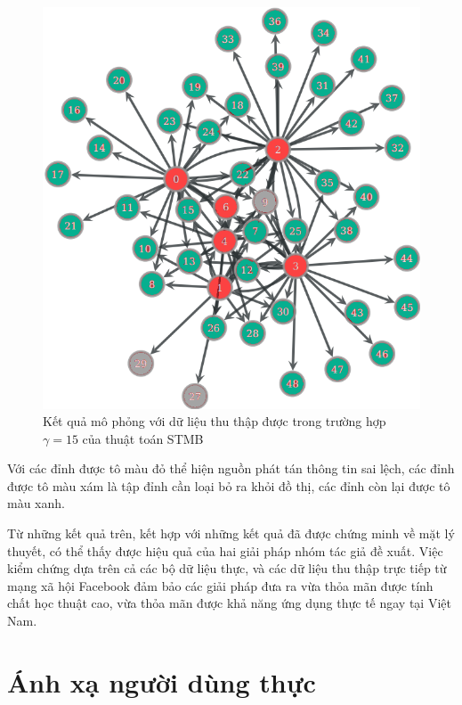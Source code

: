 \begin{itemize}
	\begin{center}
		\begin{figure}[H]
			\begin{center}
				\includegraphics [scale=.7]{picture/PartPVQ}
			\end{center}
			\caption{Kết quả mô phỏng với dữ liệu thu thập được trong trường hợp $\gamma = 15$ của thuật toán STMB}
			\label{mophong}
		\end{figure}
	\end{center}
	
	Với các đỉnh được tô màu đỏ thể hiện nguồn phát tán thông tin sai lệch, các đỉnh được tô màu xám là tập đỉnh cần loại bỏ ra khỏi đồ thị, các đỉnh còn lại được tô màu xanh.
\end{itemize}

Từ những kết quả trên, kết hợp với những kết quả đã được chứng minh về mặt lý thuyết, có thể thấy được hiệu quả của hai giải pháp nhóm tác giả đề xuất. Việc kiểm chứng dựa trên cả các bộ dữ liệu thực, và các dữ liệu thu thập trực tiếp từ mạng xã hội Facebook đảm bảo các giải pháp đưa ra vừa thỏa mãn được tính chất học thuật cao, vừa thỏa mãn được khả năng ứng dụng thực tế ngay tại Việt Nam.

\section{Ánh xạ người dùng thực}


